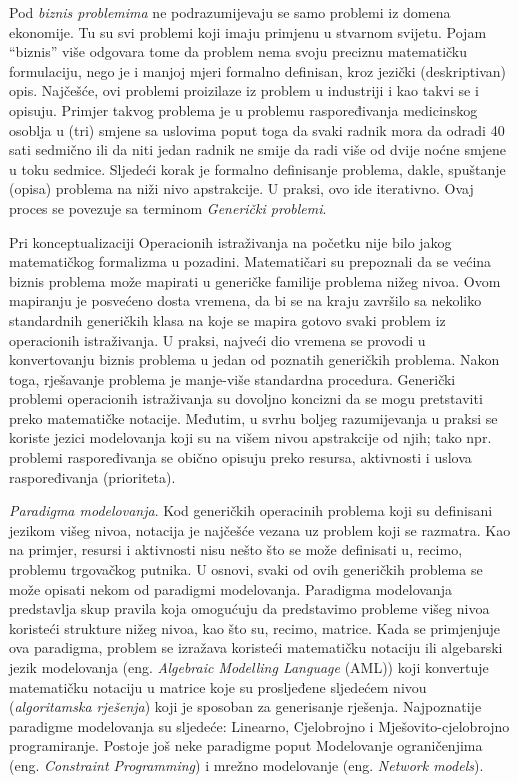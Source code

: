 \documentclass[a4paper, utf8, 11pt, colorlinks]{book}
\begin{document}
 Pod \emph{biznis problemima} ne podrazumijevaju se  samo problemi iz domena ekonomije. Tu su svi problemi koji imaju primjenu u stvarnom svijetu. Pojam ``biznis'' više odgovara tome da problem nema svoju preciznu matematičku formulaciju, nego je i manjoj mjeri formalno definisan, kroz jezički (deskriptivan) opis.  Najčešće, ovi problemi proizilaze iz problem u industriji i kao takvi se i opisuju. Primjer takvog problema je u problemu raspoređivanja medicinskog osoblja u (tri) smjene sa uslovima poput toga da svaki radnik mora da odradi 40 sati sedmično ili da niti jedan radnik ne smije da radi više od dvije noćne smjene u toku sedmice. Sljedeći korak 
 je formalno definisanje problema, dakle, spuštanje (opisa) problema na niži nivo apstrakcije. U praksi, ovo ide iterativno. Ovaj proces se povezuje sa terminom \emph{Generički problemi}. 

Pri konceptualizaciji Operacionih istraživanja na početku nije bilo jakog matematičkog formalizma u pozadini. Matematičari su prepoznali da se većina biznis problema može  mapirati u generičke familije problema nižeg nivoa. Ovom mapiranju je posvećeno dosta vremena, da bi se na kraju završilo sa nekoliko standardnih generičkih klasa na koje se mapira gotovo svaki problem iz operacionih istraživanja. U praksi, najveći dio vremena se provodi u konvertovanju biznis problema u jedan od poznatih generičkih problema. Nakon toga, rješavanje problema je manje-više standardna procedura. Generički problemi operacionih istraživanja su dovoljno koncizni da se mogu pretstaviti preko matematičke notacije. Međutim, u svrhu boljeg razumijevanja u praksi se koriste jezici modelovanja koji su na višem nivou apstrakcije od njih; tako npr. problemi raspoređivanja se obično opisuju preko resursa, aktivnosti i uslova raspoređivanja (prioriteta). 

\emph{Paradigma modelovanja}. Kod generičkih operacinih problema koji su definisani jezikom višeg nivoa, notacija je najčešće vezana uz problem koji se razmatra.
Kao na primjer, resursi i aktivnosti nisu nešto što se može definisati u, recimo, problemu trgovačkog putnika. U osnovi, svaki od ovih generičkih problema se može opisati nekom od paradigmi modelovanja. Paradigma modelovanja predstavlja skup pravila koja omogućuju da predstavimo probleme višeg nivoa koristeći strukture nižeg nivoa, kao što su, recimo, matrice. Kada se primjenjuje ova paradigma, problem se izražava koristeći matematičku notaciju ili algebarski jezik modelovanja (eng. \emph{Algebraic Modelling Language} (AML)) koji konvertuje matematičku notaciju u matrice koje su prosljeđene sljedećem nivou (\emph{algoritamska rješenja}) koji je sposoban za generisanje rješenja. Najpoznatije paradigme modelovanja su sljedeće: Linearno, Cjelobrojno i Mješovito-cjelobrojno programiranje. Postoje još neke paradigme poput Modelovanje ograničenjima (eng. \emph{Constraint Programming}) i mrežno modelovanje (eng. \emph{Network models}). 
\end{document}

